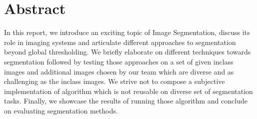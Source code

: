 \chapter{Abstract}
In this report, we introduce an exciting topic of Image Segmentation, discuss its role in imaging systems and articulate different approaches to segmentation beyond global thresholding. We briefly elaborate on different techniques towards segmentation followed by testing those approaches on a set of given inclass images and additional images chosen by our team which are diverse and as challenging as the inclass images. We strive not to compose a subjective implementation of algorithm which is not reusable on diverse set of segmentation tasks. Finally, we showcase the results of running those algorithm and conclude on evaluating segmentation methods.


